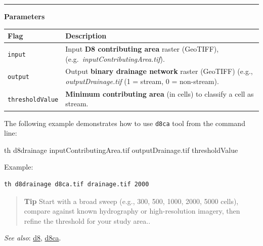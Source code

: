 \documentclass[
]{book}
\newenvironment{Shaded}{\begin{snugshade}}{\end{snugshade}}
\newcommand{\ExtensionTok}[1]{#1}
\newcommand{\NormalTok}[1]{#1}
\theoremstyle{definition}
\theoremstyle{definition}
\theoremstyle{definition}
\theoremstyle{definition}
\theoremstyle{remark}
\begin{document}
\begin{center}\rule{0.5\linewidth}{0.5pt}\end{center}

\textbf{Parameters}

\begin{longtable}[]{@{}
  >{\raggedright\arraybackslash}p{}
  >{\raggedright\arraybackslash}p{}@{}}
\toprule\noalign{}
\begin{minipage}[b]{\linewidth}\raggedright
Flag
\end{minipage} & \begin{minipage}[b]{\linewidth}\raggedright
Description
\end{minipage} \\
\midrule\noalign{}
\endhead
\bottomrule\noalign{}
\endlastfoot
\texttt{input} & Input \textbf{D8 contributing area} raster (GeoTIFF), (e.g.~\emph{inputContributingArea.tif}). \\
\texttt{output} & Output \textbf{binary drainage network} raster (GeoTIFF) (e.g., \emph{outputDrainage.tif} (1 = stream, 0 = non-stream). \\
\texttt{thresholdValue} & \textbf{Minimum contributing area} (in cells) to classify a cell as stream. \\
\end{longtable}

The following example demonstrates how to use \texttt{d8ca} tool from the command line:

\begin{Shaded}
\begin{Highlighting}[]
\ExtensionTok{th}\NormalTok{ d8drainage inputContributingArea.tif outputDrainage.tif thresholdValue}
\end{Highlighting}
\end{Shaded}

Example:

\begin{verbatim}
th d8drainage d8ca.tif drainage.tif 2000
\end{verbatim}

\begin{quote}
\textbf{Tip} Start with a broad sweep (e.g., 300, 500, 1000, 2000, 5000 cells), compare against known hydrography or high-resolution imagery, then refine the threshold for your study area..
\end{quote}

\emph{See also}: \hyperref[d8]{d8}, \hyperref[d8ca]{d8ca}.
\end{document}
